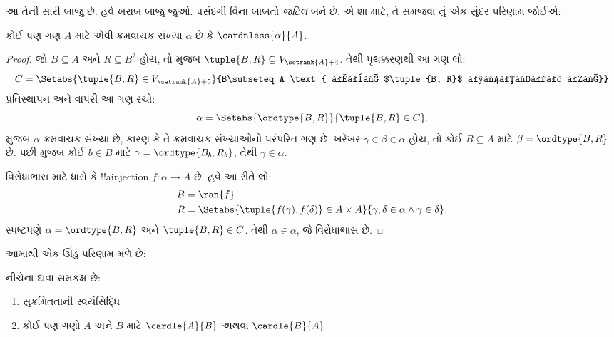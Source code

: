 \documentclass[../../../include/open-logic-section]{subfiles}
\begin{document}

આ તેની સારી બાજુ છે. હવે ખરાબ બાજુ જુઓ.
પસંદગી વિના બાબતો \emph{જટિલ} બને છે.
એ શા માટે, તે સમજવા \cite{Hartogs1915}નું
એક સુંદર પરિણામ જોઈએ:

\begin{lem}[\emph{$\ZF$માં}]
કોઈ પણ ગણ $A$ માટે એવી ક્રમવાચક સંખ્યા
$\alpha$ છે કે $\cardnless{\alpha}{A}$.
\end{lem}

\begin{proof}
જો $B \subseteq A$ અને $R \subseteq B^2$ હોય,
તો 
મુજબ $\tuple{B, R} \subseteq
V_{\setrank{A}+4}$. તેથી પૃથક્કરણથી આ ગણ લો:
\[
	C = \Setabs{\tuple{B, R} \in V_{\setrank{A}+5}}{B\subseteq A 
	\text{ અને $\tuple{B, R}$ સુક્રમ છે}}
\]
પ્રતિસ્થાપન અને
વાપરી આ ગણ રચો:
\[
	\alpha = \Setabs{\ordtype{B, R}}{\tuple{B, R} \in C}.
\]
 મુજબ
$\alpha$ ક્રમવાચક સંખ્યા છે, કારણ કે તે
ક્રમવાચક સંખ્યાઓનો પરંપરિત ગણ છે.
ખરેખર $\gamma \in \beta \in \alpha$ હોય,
તો કોઈ $B \subseteq A$ માટે
$\beta = \ordtype{B, R}$ છે. પછી
મુજબ કોઈ $b \in B$ માટે
$\gamma = \ordtype{B_b, R_b}$, તેથી
$\gamma \in \alpha$.

વિરોધાભાસ માટે ધારો કે !!a{injection}
$f \colon \alpha \to A$ છે. હવે આ રીતે લો:
\begin{align*}
	B &= \ran{f}\\
	R &= \Setabs{\tuple{f(\gamma), f(\delta)} \in A \times A}{\gamma,\delta\in\alpha \land \gamma \in \delta}.
\end{align*}
સ્પષ્ટપણે $\alpha = \ordtype{B, R}$ અને
$\tuple{B, R} \in C$. તેથી $\alpha
\in \alpha$, જે વિરોધાભાસ છે.
\end{proof}

આમાંથી એક ઊંડું પરિણામ મળે છે:

\begin{thm}[\emph{$\ZF$માં}]
નીચેના દાવા સમકક્ષ છે:
\begin{enumerate}
	\item{} સુક્રમિતતાની સ્વયંસિદ્ધિ
	\item{} કોઈ પણ ગણો $A$ અને $B$ માટે
	$\cardle{A}{B}$ અથવા $\cardle{B}{A}$
\end{enumerate}
\end{thm}
\end{document}
